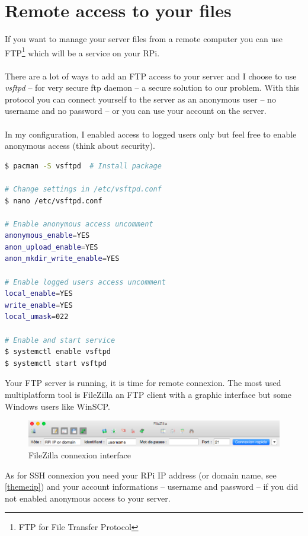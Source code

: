 \section{Remote access to your files}

If you want to manage your server files from a remote computer you can use 
FTP\footnote{FTP for File Transfer Protocol} which will be a service on your 
RPi. 
\\\\
There are a lot of ways to add an FTP access to your server and I choose to use 
\emph{vsftpd} -- for very secure ftp daemon -- a secure solution to our problem. 
With this protocol you can connect yourself to the server as an anonymous user 
-- no username and no password -- or you can use your account on the server. 
\\\\
In my configuration, I enabled access to logged users only but feel free to 
enable anonymous access (think about security).

\begin{lstlisting}[language=bash,caption=VsFTPd setup]
$ pacman -S vsftpd  # Install package

# Change settings in /etc/vsftpd.conf
$ nano /etc/vsftpd.conf

# Enable anonymous access uncomment
anonymous_enable=YES
anon_upload_enable=YES
anon_mkdir_write_enable=YES

# Enable logged users access uncomment
local_enable=YES
write_enable=YES
local_umask=022

# Enable and start service
$ systemctl enable vsftpd
$ systemctl start vsftpd
\end{lstlisting}

Your FTP server is running, it is time for remote connexion. The most used 
multiplatform tool is FileZilla an FTP client with a graphic interface but some 
Windows users like WinSCP.

\begin{figure}[h]
	\centering
	\includegraphics[scale=0.4]{images/FileZillaConnect.png}
	\caption{FileZilla connexion interface}
	\label{figure:WifiMenu}
\end{figure}

As for SSH connexion you need your RPi IP address (or domain name, see 
\ref{theme:ip}) and your account informations -- username and password -- if you 
did not enabled anonymous access to your server.
%
